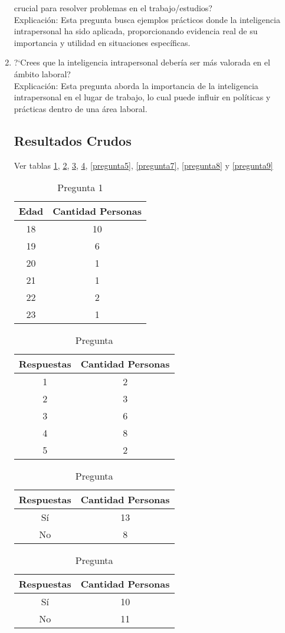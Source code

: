 \begin{enumerate}
crucial para resolver problemas en el trabajo/estudios?\\
Explicación: Esta pregunta busca ejemplos prácticos donde la inteligencia intrapersonal ha sido aplicada, proporcionando evidencia real de su importancia y utilidad en situaciones específicas.
\item ?`Crees que la inteligencia intrapersonal deber\'ia ser m\'as valorada en el
\'ambito laboral?\\
Explicación: Esta pregunta aborda la importancia de la inteligencia intrapersonal en el lugar de trabajo, lo cual puede influir en políticas y prácticas dentro de una área laboral.

\subsection{Resultados Crudos}
Ver tablas
\ref{tab:pregunta1},
\ref{pregunta2},
\ref{pregunta3},
\ref{pregunta4},
\ref{pregunta5},
\ref{pregunta7},
\ref{pregunta8} y
\ref{pregunta9}
\begin{table}
	\caption{Pregunta 1\label{tab:pregunta1}}
\begin{tabular}{cc}
\hline
Edad & Cantidad Personas\\
\hline
18 & 10\\
19 & 6\\
20 & 1\\
21 & 1\\
22 & 2\\
23 & 1\\
\hline
\end{tabular}
\end{table}
\begin{table}
	\caption{Pregunta \thetable\label{pregunta2}}
\begin{tabular}{cc}
\hline
Respuestas & Cantidad Personas\\
\hline
1 & 2\\
2 & 3\\
3 & 6\\
4 & 8\\
5 & 2\\
\hline
\end{tabular}
\end{table}
\begin{table}
	\caption{Pregunta \thetable\label{pregunta3}}
\begin{tabular}{cc}
\hline
Respuestas & Cantidad Personas\\
\hline
S\'i & 13\\
No & 8\\
\hline
\end{tabular}
\end{table}
\begin{table}
	\caption{Pregunta \thetable\label{pregunta4}}
\begin{tabular}{cc}
\hline
Respuestas & Cantidad Personas\\
\hline
S\'i & 10\\
No & 11\\
\hline
\end{tabular}
\end{table}


\end{enumerate}
